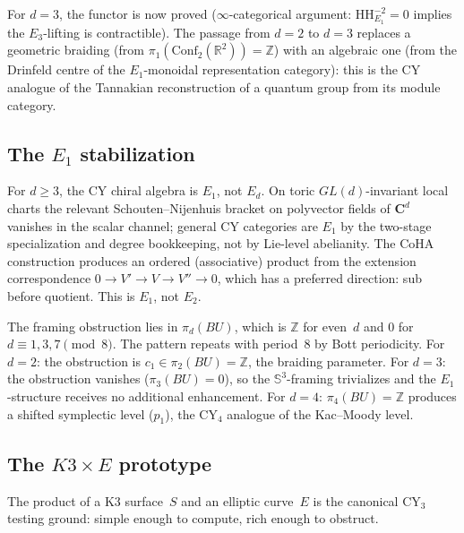 \documentclass[11pt,reqno]{amsart}
\theoremstyle{definition}
\theoremstyle{remark}
\newcommand{\Conf}{\mathrm{Conf}}
\renewcommand{\Bbbk}{\mathbf{C}}
\numberwithin{equation}{section}
\begin{document}
For $d = 3$, the functor is now proved ($\infty$-categorical
argument: $\mathrm{HH}^{-2}_{E_1} = 0$ implies the $E_3$-lifting
is contractible). The passage from $d = 2$ to $d = 3$
replaces a geometric braiding (from
$\pi_1(\Conf_2(\mathbb{R}^2)) = \mathbb{Z}$) with an
algebraic one (from the Drinfeld centre of the
$E_1$-monoidal representation category): this is the CY
analogue of the Tannakian reconstruction of a quantum group
from its module category.

\subsection{The $E_1$ stabilization}
\label{ssec:e1-stabilization}

For $d \ge 3$, the CY chiral algebra is $E_1$, not $E_d$.
On toric $GL(d)$-invariant local charts the relevant
Schouten--Nijenhuis bracket on polyvector fields of $\Bbbk^d$
vanishes in the scalar channel; general CY categories are
$E_1$ by the two-stage specialization and degree bookkeeping,
not by Lie-level abelianity.
The CoHA construction produces an ordered (associative) product
from the extension correspondence
$0 \to V' \to V \to V'' \to 0$, which has a preferred
direction: sub before quotient. This is $E_1$, not $E_2$.

The framing obstruction lies in $\pi_d(BU)$, which is
$\mathbb{Z}$ for even~$d$ and $0$ for $d \equiv 1, 3, 7
\pmod{8}$. The pattern repeats with period~$8$ by Bott
periodicity. For $d = 2$: the obstruction is
$c_1 \in \pi_2(BU) = \mathbb{Z}$, the braiding parameter.
For $d = 3$: the obstruction vanishes
($\pi_3(BU) = 0$), so the $\mathbb{S}^3$-framing trivializes
and the $E_1$-structure receives no additional enhancement.
For $d = 4$: $\pi_4(BU) = \mathbb{Z}$ produces a shifted
symplectic level ($p_1$), the CY$_4$ analogue of the
Kac--Moody level.

\subsection{The $K3 \times E$ prototype}
\label{ssec:k3-times-e}

The product of a K3 surface~$S$ and an elliptic curve~$E$
is the canonical CY$_3$ testing ground: simple enough to
compute, rich enough to obstruct.
\end{document}
